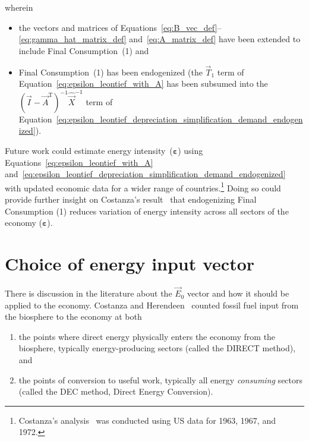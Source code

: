 \noindent{}wherein 

\begin{itemize}
	\item{the vectors and matrices of Equations~\ref{eq:B_vec_def}--\ref{eq:gamma_hat_matrix_def}
	and~\ref{eq:A_matrix_def} have been extended to include Final Consumption~(1) and}
	
	\item{Final Consumption~(1) has been endogenized
	(the $\vec{T}_{1}$ term of Equation~\ref{eq:epsilon_leontief_with_A}
	has been subsumed into the 
	${(\vec{I} - \vec{A}^{\mathrm{T}})}^{-1}\hat{\vec{X}}^{-1}$
	term of Equation~\ref{eq:epsilon_leontief_depreciation_simplification_demand_endogenized}).}
\end{itemize}

Future work could estimate energy intensity~($\boldsymbol{\varepsilon}$) 
using Equations~\ref{eq:epsilon_leontief_with_A}
and~\ref{eq:epsilon_leontief_depreciation_simplification_demand_endogenized}
with updated economic data for a wider range of countries.\footnote{Costanza's
analysis~\cite{Costanza:1980ww} was conducted using US data for 1963, 1967, and 1972.}
Doing so could provide further insight on Costanza's result~\cite{Costanza:1980ww}
that endogenizing Final Consumption (1) reduces variation 
of energy intensity across all sectors of the economy ($\boldsymbol{\varepsilon}$).


\section{Choice of energy input vector}
\label{sec:energy_input_vector}

There is discussion in the literature about the $\vec{E}_{0}$
vector and how it should be applied to the economy.
Costanza and Herendeen~\cite{Costanza:1984tq} counted fossil fuel input 
from the biosphere to the economy
at both 

\begin{enumerate}
	\item the points where direct energy physically 
		enters the economy from the biosphere, 
		typically energy-producing sectors
		(called the DIRECT method), and
	\item the points of conversion to useful work, 
		typically all energy \emph{consuming} sectors
		(called the DEC method, 
		Direct Energy Conversion).
\end{enumerate}

